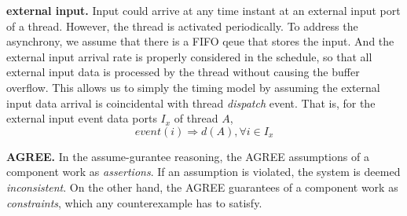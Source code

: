 %	
%

{\bf external input.} 
Input could arrive at any time instant at an external input port of a thread. However, the thread is activated periodically. To address the asynchrony, we assume that there is a FIFO qeue that stores the input. And the external input arrival rate is properly considered in the schedule, so that all external input data is processed by the thread without causing the buffer overflow. This allows us to simply the timing model by assuming the external input data arrival is coincidental with thread \emph{dispatch} event. That is, for the external input event data ports $I_x$ of thread $A$, 
$$ event(i) \Rightarrow d(A), \forall i \in I_x $$

{\bf AGREE.}
In the assume-gurantee reasoning, the AGREE assumptions of a component work as \emph{assertions}. If an assumption is violated, the system is deemed \emph{inconsistent}. On the other hand, the AGREE guarantees of a component work as \emph{constraints}, which any counterexample has to satisfy.



